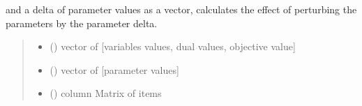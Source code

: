 \documentclass[letterpaper,10pt,english]{sphinxmanual}
\begin{document}
\begin{fulllineitems}
\label{\detokenize{src.sensitivity.sensitivity_tools:src.sensitivity.sensitivity_tools.DifferentialMapping}}
\pysigstartsignatures
\pysiglinewithargsret
{}
{\sphinxparamcomma {}\sphinxparamcomma {}\sphinxparamcomma {}\sphinxparamcomma {}}
{}
\pysigstopsignatures{}

\begin{fulllineitems}
\label{\detokenize{src.sensitivity.sensitivity_tools:src.sensitivity.sensitivity_tools.DifferentialMapping.extrapolate}}
\pysigstartsignatures
\pysiglinewithargsret
{}
{\sphinxparamcomma {}}
{}
\pysigstopsignatures\begin{description}
\sphinxAtStartPar
and a delta of parameter values as a vector, calculates the effect of perturbing the parameters
by the parameter delta.

\end{description}
\begin{quote}\begin{description}
\begin{itemize}
\item {} 
\sphinxAtStartPar
{} () \textendash{} vector of {[}variables values, dual values, objective value{]}

\item {} 
\sphinxAtStartPar
{} () \textendash{} vector of {[}parameter values{]}

\end{itemize}

\sphinxAtStartPar
\begin{itemize}
\item {} 
\sphinxAtStartPar
{} () \textendash{} column Matrix of items


\end{itemize}
\end{description}
\end{quote}
\end{fulllineitems}
\end{fulllineitems}
\end{document}
